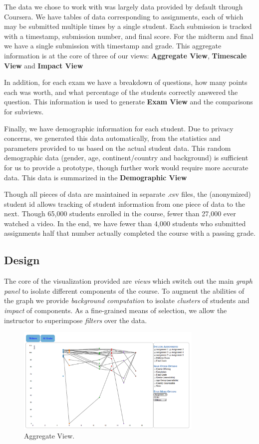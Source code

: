 The data we chose to work with was largely data provided by default through Coursera. We have tables of data corresponding to assignments, each of which may be submitted multiple times by a single student. Each submission is tracked with a  timestamp, submission number, and final score. For the midterm and final we have a single submission with timestamp and grade. This aggregate information is at the core of three of our views: {\bf Aggregate View}, {\bf Timescale View} and {\bf
Impact View}

In addition, for each exam we have a breakdown of questions, how many points each was worth, and what percentage of the students correctly answered the question. This information is used to generate
{\bf Exam View} and the comparisons for subviews. 

Finally, we have demographic information for each student. Due to privacy concerns, we generated this data automatically, from the statistics and parameters provided to us based on the actual student data. This random demographic data (gender, age, continent/country and background) is sufficient for us to provide a prototype, though further work would require more accurate data. This data is summarized in the {\bf Demographic View} 

Though all pieces of data are maintained in separate .csv files, the (anonymized) student id allows tracking of student information from one piece of data to the next. Though 65,000 students enrolled in the course, fewer than 27,000 ever watched a video. In the end, we have fewer than 4,000 students who submitted assignments half that number actually completed the course with a passing grade. 

\subsection{Design}
The core of the visualization provided are \emph{views} which switch out the main \emph{graph panel} to isolate different components of the course. To augment the abilities of the graph we provide 
\emph{background computation} to isolate \emph{clusters} of students and \emph{impact} of components. As a fine-grained means of selection, we allow the instructor to superimpose \emph{filters} over the data.


\begin{figure}[htb]
 \centering
 \includegraphics[width=3.5in]{aggregate_stub.png}
 \caption{Aggregate View.}
 \label{fig:aggregate}	
\end{figure}

